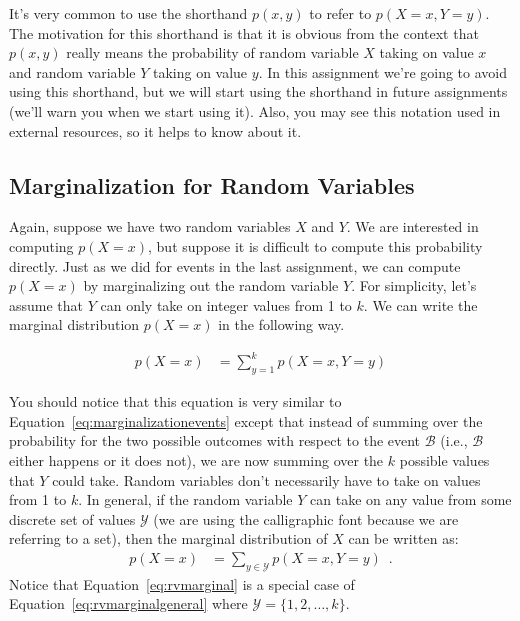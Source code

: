 \documentclass[assignment02_Solutions]{subfiles}
\begin{document}
\begin{notice}
It's very common to use the shorthand $p(x, y)$ to refer to $p(X = x, Y = y)$.  The motivation for this shorthand is that it is obvious from the context that $p(x, y)$ really means the probability of random variable $X$ taking on value $x$ and random variable $Y$ taking on value $y$.  In this assignment we're going to avoid using this shorthand, but we will start using the shorthand in future assignments (we'll warn you when we start using it).  Also, you may see this notation used in external resources, so it helps to know about it.
\end{notice}

\subsection{Marginalization for Random Variables}
Again, suppose we have two random variables $X$ and $Y$.  We are interested in computing $p(X = x)$, but suppose it is difficult to compute this probability directly.  Just as we did for events in the last assignment, we can compute $p(X=x)$ by marginalizing out the random variable $Y$.  For simplicity, let's assume that $Y$ can only take on integer values from 1 to $k$.  We can write the marginal distribution $p(X=x)$ in the following way.

\begin{align}
p(X=x) &= \sum_{y=1}^k p(X=x, Y=y)\label{eq:rvmarginal}
\end{align}

You should notice that this equation is very similar to Equation~\ref{eq:marginalizationevents} except that instead of summing over the probability for the two possible outcomes with respect to the event $\mathcal{B}$ (i.e., $\mathcal{B}$ either happens or it does not), we are now summing over the $k$ possible values that $Y$ could take.  Random variables don't necessarily have to take on values from 1 to $k$.  In general, if the random variable $Y$ can take on any value from some discrete set of values $\mathcal{Y}$ (we are using the calligraphic font because we are referring to a set), then the marginal distribution of $X$ can be written as:
\begin{align}
p(X=x) &= \sum_{y \in \mathcal{Y}} p(X=x, Y=y) \enspace . \label{eq:rvmarginalgeneral}
\end{align}
Notice that Equation~\ref{eq:rvmarginal} is a special case of Equation~\ref{eq:rvmarginalgeneral} where $\mathcal{Y} = \{1, 2, \ldots, k\}$.
\end{document}
